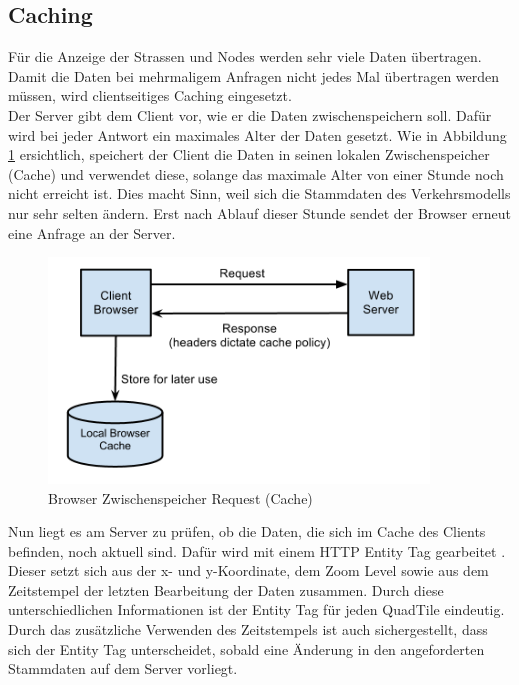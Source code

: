 \subsection{Caching}
Für die Anzeige der Strassen und Nodes werden sehr viele Daten übertragen. Damit die Daten bei mehrmaligem Anfragen nicht jedes Mal übertragen werden müssen, wird clientseitiges Caching eingesetzt.\\
Der Server gibt dem Client vor, wie er die Daten zwischenspeichern soll. Dafür wird bei jeder Antwort ein maximales Alter der Daten gesetzt. Wie in Abbildung \ref{pic:browser_cache} ersichtlich, speichert der Client die Daten in seinen lokalen Zwischenspeicher (Cache) und verwendet diese, solange das maximale Alter von einer Stunde noch nicht erreicht ist. Dies macht Sinn, weil sich die Stammdaten des Verkehrsmodells nur sehr selten ändern. Erst nach Ablauf dieser Stunde sendet der Browser erneut eine Anfrage an der Server.
\begin{figure}[H]
\centering
\includegraphics[height=6cm]{images/browser_cache.jpg}
\caption{Browser Zwischenspeicher Request (Cache) \cite{HTTPCacheHeaders}}
\label{pic:browser_cache}
\end{figure}
\newpage
\noindent
Nun liegt es am Server zu prüfen, ob die Daten, die sich im Cache des Clients befinden, noch aktuell sind. Dafür wird mit einem HTTP Entity Tag gearbeitet \cite{WikipediaETag}. Dieser setzt sich aus der x- und y-Koordinate, dem Zoom Level sowie aus dem Zeitstempel der letzten Bearbeitung der Daten zusammen. Durch diese unterschiedlichen Informationen ist der Entity Tag für jeden QuadTile eindeutig. Durch das zusätzliche Verwenden des Zeitstempels ist auch sichergestellt, dass sich der Entity Tag unterscheidet, sobald eine Änderung in den angeforderten Stammdaten auf dem Server vorliegt.\\
